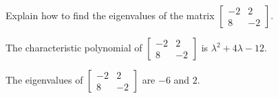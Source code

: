
\begin{exerciseStatement}


Explain how to find the eigenvalues of the matrix \( \left[\begin{array}{cc}
-2 & 2 \\
8 & -2
\end{array}\right] \).


\end{exerciseStatement}
    
\begin{exerciseAnswer} 


The characteristic polynomial of \( \left[\begin{array}{cc}
-2 & 2 \\
8 & -2
\end{array}\right] \) is \( \lambda^{2} + 4 \lambda - 12 \).



The eigenvalues of \( \left[\begin{array}{cc}
-2 & 2 \\
8 & -2
\end{array}\right] \) are \( -6 \) and \( 2 \).


\end{exerciseAnswer}
    
